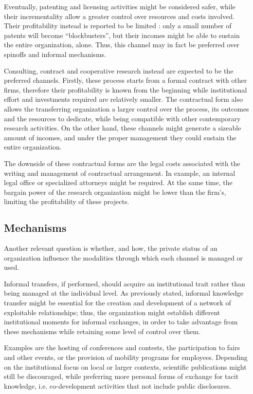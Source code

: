Eventually, patenting and licensing activities might be considered safer, while their incrementality allow a greater control over resources and costs involved. Their profitability instead is reported to be limited \citep{Balderi2010}: only a small number of patents will become \enquote{blockbusters}, but their incomes might be able to sustain the entire organization, alone. Thus, this channel may in fact be preferred over spinoffs and informal mechanisms.

Consulting, contract and cooperative research instead are expected to be the preferred channels. Firstly, these process starts from a formal contract with other firms, therefore their profitability is known from the beginning while institutional effort and investments required are relatively smaller. The contractual form also allows the transferring organization a larger control over the process, its outcomes and the resources to dedicate, while being compatible with other contemporary research activities. On the other hand, these channels might generate a sizeable amount of incomes, and under the proper management they could sustain the entire organization. 

The downside of these contractual forms are the legal costs associated with the writing and management of contractual arrangement. In example, an internal legal office or specialized attorneys might be required. At the same time, the bargain power of the research organization might be lower than the firm's, limiting the profitability of these projects. 

\subsection{Mechanisms}

Another relevant question is whether, and how, the private status of an organization influence the modalities through which each channel is managed or used. 

Informal transfers, if performed, should acquire an institutional trait rather than being managed at the individual level. As previously stated, informal knowledge transfer might be essential for the creation and development of a network of exploitable relationships; thus, the organization might establish different institutional moments for informal exchanges, in order to take advantage from these mechanisms while retaining some level of control over them. 

Examples are the hosting of conferences and contests, the participation to fairs and other events, or the provision of mobility programs for employees. Depending on the institutional focus on local or larger contexts, scientific publications might still be discouraged, while preferring more personal forms of exchange for tacit knowledge, i.e. co-development activities that not include public disclosures. 

